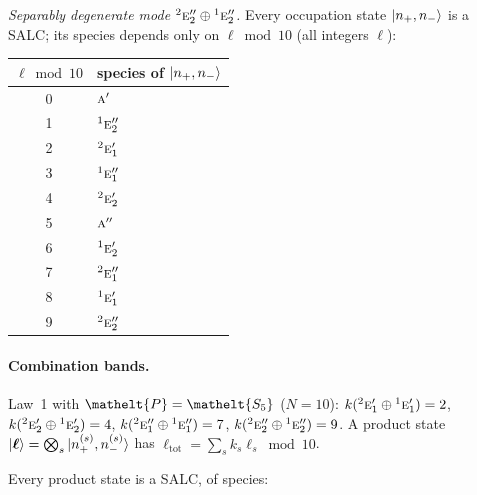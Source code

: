 \documentclass[11pt]{article}
\newcommand{\eltfont}[1]{{\let\sigma\eltsigma\mathelt{#1}}}
\newcommand{\irr}[1]{\text{\normalfont\scshape #1}}
\newcommand{\conjpair}[1]{{}^{#1}}
\newcommand{\elt}[1]{\eltfont{#1}}
\newcommand{\pel}{\elt{P}}             %
\begin{document}
\emph{Separably degenerate mode $\conjpair{2}\irr{e}_{2}''\oplus \conjpair{1}\irr{e}_{2}''$.} Every occupation state $\ket{n_+,n_-}$ is a SALC; its species depends only on $\ell\bmod 10$ (all integers $\ell$):
\begin{longtable}{c l}\hline $\ell\bmod 10$ & species of $\ket{n_+,n_-}$\\ \hline\endhead
0 & $\irr{a}'$\\
1 & $\conjpair{1}\irr{e}_{2}''$\\
2 & $\conjpair{2}\irr{e}_{1}'$\\
3 & $\conjpair{1}\irr{e}_{1}''$\\
4 & $\conjpair{2}\irr{e}_{2}'$\\
5 & $\irr{a}''$\\
6 & $\conjpair{1}\irr{e}_{2}'$\\
7 & $\conjpair{2}\irr{e}_{1}''$\\
8 & $\conjpair{1}\irr{e}_{1}'$\\
9 & $\conjpair{2}\irr{e}_{2}''$\\
\hline\end{longtable}

\paragraph{Combination bands.}

Law~1 with $\pel=\elt{S_{5}}$ ($N=10$): $k(\conjpair{2}\irr{e}_{1}'\oplus \conjpair{1}\irr{e}_{1}')=2$, $k(\conjpair{2}\irr{e}_{2}'\oplus \conjpair{1}\irr{e}_{2}')=4$, $k(\conjpair{2}\irr{e}_{1}''\oplus \conjpair{1}\irr{e}_{1}'')=7$, $k(\conjpair{2}\irr{e}_{2}''\oplus \conjpair{1}\irr{e}_{2}'')=9$. A product state $\ket{\boldsymbol\ell}=\bigotimes_s\ket{n_+^{(s)},n_-^{(s)}}$ has $\ell_{\mathrm{tot}}=\sum_sk_s\ell_s\bmod 10$.

Every product state is a SALC, of species:
\end{document}
